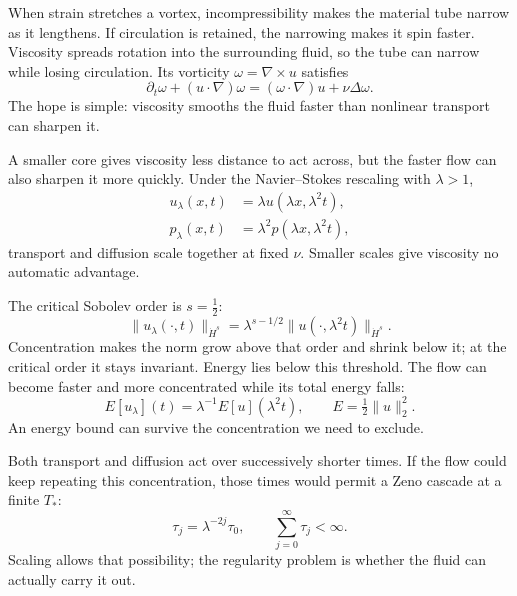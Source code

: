 When strain stretches a vortex, incompressibility makes the material tube
narrow as it lengthens. If circulation is retained, the narrowing makes it
spin faster. Viscosity spreads rotation into the surrounding fluid, so the
tube can narrow while losing circulation. Its vorticity
\(\omega=\nabla\times u\) satisfies
\[
 \partial_t\omega+(u\cdot\nabla)\omega
 =(\omega\cdot\nabla)u+\nu\Delta\omega.
\]
The hope is simple: viscosity smooths the fluid faster than nonlinear
transport can sharpen it.

A smaller core gives viscosity less distance to act across, but the faster
flow can also sharpen it more quickly. Under the Navier--Stokes rescaling
with \(\lambda>1\),
\[
 \begin{aligned}
 u_\lambda(x,t)&=\lambda u(\lambda x,\lambda^2t),\\
 p_\lambda(x,t)&=\lambda^2p(\lambda x,\lambda^2t),
 \end{aligned}
\]
transport and diffusion scale together at fixed \(\nu\). Smaller scales give
viscosity no automatic advantage.

The critical Sobolev order is \(s=\tfrac12\):
\[
 \|u_\lambda(\cdot,t)\|_{\dot H^s}
 =\lambda^{s-1/2}\|u(\cdot,\lambda^2t)\|_{\dot H^s}.
\]
Concentration makes the norm grow above that order and shrink below it;
at the critical order it stays invariant. Energy lies below this threshold.
The flow can become faster and more concentrated while its total energy
falls:
\[
 E[u_\lambda](t)=\lambda^{-1}E[u](\lambda^2t),
 \qquad E=\tfrac12\|u\|_2^2.
\]
An energy bound can survive the concentration we need to exclude.

Both transport and diffusion act over successively shorter times. If the
flow could keep repeating this concentration, those times would permit a
Zeno cascade at a finite \(T_*\):
\[
 \tau_j=\lambda^{-2j}\tau_0,
 \qquad \sum_{j=0}^{\infty}\tau_j<\infty.
\]
Scaling allows that possibility; the regularity
problem is whether the fluid can actually carry it out.

